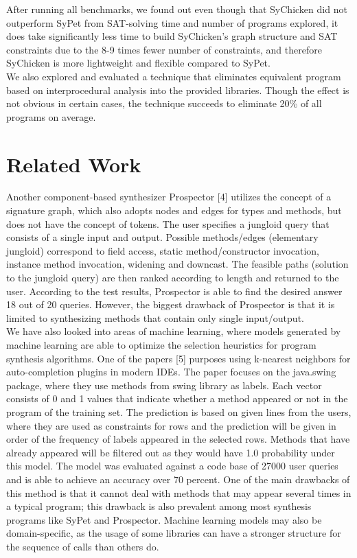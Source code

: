 \documentclass[twocolumn]{article}
\begin{document}
After running all benchmarks, we found out even though that SyChicken did not outperform SyPet from SAT-solving time and number of programs explored, it does take significantly less time to build SyChicken's graph structure and SAT constraints due to the 8-9 times fewer number of constraints, and therefore SyChicken is more lightweight and flexible compared to SyPet.\\

We also explored and evaluated a technique that eliminates equivalent program based on interprocedural analysis into the provided libraries. Though the effect is not obvious in certain cases, the technique succeeds to eliminate 20\% of all programs on average.\\

\section*{Related Work}
 Another component-based synthesizer Prospector [4] utilizes the concept of a signature graph, which also adopts nodes and edges for types and methods, but does not have the concept of tokens. The user specifies a jungloid query that consists of a single input and output. Possible methods/edges (elementary jungloid) correspond to field access, static method/constructor invocation, instance method invocation, widening and downcast. The feasible paths (solution to the jungloid query) are then ranked according to length and returned to the user. According to the test results, Prospector is able to find the desired answer 18 out of 20 queries. However, the biggest drawback of Prospector is that it is limited to synthesizing methods that contain only single input/output.\\
 
 We have also looked into areas of machine learning, where models generated by machine learning are able to optimize the selection heuristics for program synthesis algorithms. One of the papers [5] purposes using k-nearest neighbors for auto-completion plugins in modern IDEs. The paper focuses on the java.swing package, where they use methods from swing library as labels. Each vector consists of 0 and 1 values that indicate whether a method appeared or not in the program of the training set. The prediction is based on given lines from the users, where they are used as constraints for rows and the prediction will be given in order of the frequency of labels appeared in the selected rows. Methods that have already appeared will be filtered out as they would have 1.0 probability under this model. The model was evaluated against a code base of 27000 user queries and is able to achieve an accuracy over 70 percent. One of the main drawbacks of this method is that it cannot deal with methods that may appear several times in a typical program; this drawback is also prevalent among most synthesis programs like SyPet and Prospector. Machine learning models may also be domain-specific, as the usage of some libraries can have a stronger structure for the sequence of calls than others do.\\
\end{document}

